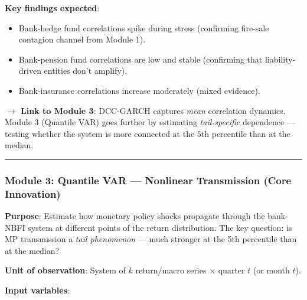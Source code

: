 \documentclass[11pt,a4paper]{article}
\begin{document}
\textbf{Key findings expected}:
\begin{itemize}
\item Bank-hedge fund correlations spike during stress (confirming fire-sale contagion channel from Module 1).
\item Bank-pension fund correlations are low and stable (confirming that liability-driven entities don't amplify).
\item Bank-insurance correlations increase moderately (mixed evidence).

\end{itemize}
\textbf{$\rightarrow$ Link to Module 3}: DCC-GARCH captures \textit{mean} correlation dynamics. Module 3 (Quantile VAR) goes further by estimating \textit{tail-specific} dependence --- testing whether the system is more connected at the 5th percentile than at the median.


\bigskip\noindent\rule{\textwidth}{0.4pt}\bigskip


\subsubsection{Module 3: Quantile VAR --- Nonlinear Transmission (Core Innovation)}

\textbf{Purpose}: Estimate how monetary policy shocks propagate through the bank-NBFI system at different points of the return distribution. The key question: is MP transmission a \textit{tail phenomenon} --- much stronger at the 5th percentile than at the median?

\textbf{Unit of observation}: System of $k$ return/macro series $\times$ quarter $t$ (or month $t$).

\textbf{Input variables}:
\end{document}
